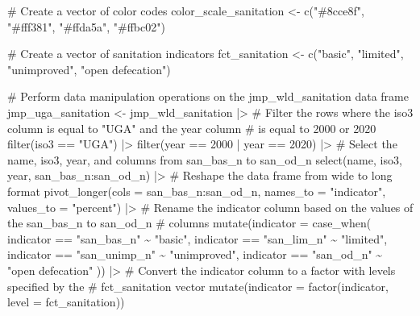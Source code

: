 \documentclass[
  letterpaper,
  DIV=11,
  numbers=noendperiod]{scrartcl}
\newenvironment{Shaded}{\begin{snugshade}}{\end{snugshade}}
\newcommand{\AttributeTok}[1]{\textcolor[rgb]{0.40,0.45,0.13}{#1}}
\newcommand{\CommentTok}[1]{\textcolor[rgb]{0.37,0.37,0.37}{#1}}
\newcommand{\DecValTok}[1]{\textcolor[rgb]{0.68,0.00,0.00}{#1}}
\newcommand{\FunctionTok}[1]{\textcolor[rgb]{0.28,0.35,0.67}{#1}}
\newcommand{\NormalTok}[1]{\textcolor[rgb]{0.00,0.23,0.31}{#1}}
\newcommand{\OtherTok}[1]{\textcolor[rgb]{0.00,0.23,0.31}{#1}}
\newcommand{\SpecialCharTok}[1]{\textcolor[rgb]{0.37,0.37,0.37}{#1}}
\newcommand{\StringTok}[1]{\textcolor[rgb]{0.13,0.47,0.30}{#1}}
\begin{document}
\begin{Shaded}
\begin{Highlighting}[]
\CommentTok{\# Create a vector of color codes}
\NormalTok{color\_scale\_sanitation }\OtherTok{\textless{}{-}} \FunctionTok{c}\NormalTok{(}\StringTok{"\#8cce8f"}\NormalTok{, }\StringTok{"\#fff381"}\NormalTok{, }\StringTok{"\#ffda5a"}\NormalTok{, }\StringTok{"\#ffbc02"}\NormalTok{)}

\CommentTok{\# Create a vector of sanitation indicators}
\NormalTok{fct\_sanitation }\OtherTok{\textless{}{-}} \FunctionTok{c}\NormalTok{(}\StringTok{"basic"}\NormalTok{, }\StringTok{"limited"}\NormalTok{, }\StringTok{"unimproved"}\NormalTok{, }\StringTok{"open defecation"}\NormalTok{)}

\CommentTok{\# Perform data manipulation operations on the jmp\_wld\_sanitation data frame}
\NormalTok{jmp\_uga\_sanitation }\OtherTok{\textless{}{-}}\NormalTok{ jmp\_wld\_sanitation }\SpecialCharTok{|\textgreater{}} 
  \CommentTok{\# Filter the rows where the iso3 column is equal to "UGA" and the year column }
  \CommentTok{\# is equal to 2000 or 2020}
  \FunctionTok{filter}\NormalTok{(iso3 }\SpecialCharTok{==} \StringTok{"UGA"}\NormalTok{) }\SpecialCharTok{|\textgreater{}} 
  \FunctionTok{filter}\NormalTok{(year }\SpecialCharTok{==} \DecValTok{2000} \SpecialCharTok{|}\NormalTok{ year }\SpecialCharTok{==} \DecValTok{2020}\NormalTok{) }\SpecialCharTok{|\textgreater{}} 
  \CommentTok{\# Select the name, iso3, year, and columns from san\_bas\_n to san\_od\_n}
  \FunctionTok{select}\NormalTok{(name, iso3, year, san\_bas\_n}\SpecialCharTok{:}\NormalTok{san\_od\_n) }\SpecialCharTok{|\textgreater{}} 
  \CommentTok{\# Reshape the data frame from wide to long format}
  \FunctionTok{pivot\_longer}\NormalTok{(}\AttributeTok{cols =}\NormalTok{ san\_bas\_n}\SpecialCharTok{:}\NormalTok{san\_od\_n, }
               \AttributeTok{names\_to =} \StringTok{"indicator"}\NormalTok{, }
               \AttributeTok{values\_to =} \StringTok{"percent"}\NormalTok{) }\SpecialCharTok{|\textgreater{}} 
  \CommentTok{\# Rename the indicator column based on the values of the san\_bas\_n to san\_od\_n}
  \CommentTok{\# columns}
  \FunctionTok{mutate}\NormalTok{(}\AttributeTok{indicator =} \FunctionTok{case\_when}\NormalTok{(}
\NormalTok{    indicator }\SpecialCharTok{==} \StringTok{"san\_bas\_n"} \SpecialCharTok{\textasciitilde{}} \StringTok{"basic"}\NormalTok{,}
\NormalTok{    indicator }\SpecialCharTok{==} \StringTok{"san\_lim\_n"} \SpecialCharTok{\textasciitilde{}} \StringTok{"limited"}\NormalTok{,}
\NormalTok{    indicator }\SpecialCharTok{==} \StringTok{"san\_unimp\_n"} \SpecialCharTok{\textasciitilde{}} \StringTok{"unimproved"}\NormalTok{,}
\NormalTok{    indicator }\SpecialCharTok{==} \StringTok{"san\_od\_n"} \SpecialCharTok{\textasciitilde{}} \StringTok{"open defecation"}
\NormalTok{  )) }\SpecialCharTok{|\textgreater{}} 
  \CommentTok{\# Convert the indicator column to a factor with levels specified by the }
  \CommentTok{\# fct\_sanitation vector}
  \FunctionTok{mutate}\NormalTok{(}\AttributeTok{indicator =} \FunctionTok{factor}\NormalTok{(indicator, }\AttributeTok{level =}\NormalTok{ fct\_sanitation))}
\end{Highlighting}
\end{Shaded}
\end{document}
